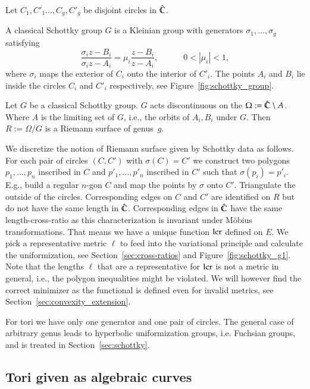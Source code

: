 \documentclass[Thesis]{subfiles}
\begin{document}
Let $C_1,C'_1\ldots,C_g,C'_g$ be disjoint circles in $\hat{\mathbb C}$.
\begin{definition} A classical Schottky group $G$ is a Kleinian group with generators $\sigma_1,\ldots,\sigma_g$ satisfying
\begin{equation}
\frac{\sigma_i z - B_i}{\sigma_i z - A_i} = \mu_i \frac{z - B_i}{z - A_i},
\quad\quad\quad 0 < \left|\mu_i\right|<1,
\end{equation}
where $\sigma_i$ maps the exterior of $C_i$ onto the interior of $C'_i$. The points $A_i$ and $B_i$ lie inside the circles $C_i$ and $C'_i$ respectively, see Figure~\ref{fig:schottky_group}.
\end{definition}
Let $G$ be a classical Schottky group. $G$ acts discontinuous on the $\Omega:=\hat{\mathbb C}\setminus A$. 
Where $A$ is the limiting set of $G$, i.e., the orbits of $A_i, B_i$ under $G$.
Then $R:=\Omega/G$ is a Riemann surface of genus~$g$.

We discretize the notion of Riemann surface given by Schottky data as follows.
For each pair of circles $(C, C')$ with $\sigma(C) =C'$ we construct two polygons $p_1,\ldots,p_n$ inscribed in $C$ and $p'_1,\ldots,p'_n$ inscribed in $C'$ such that $\sigma(p_i)=p'_i$. E.g., build a regular $n$-gon $C$ and map the points by $\sigma$ onto $C'$.
Triangulate the outside of the circles.
Corresponding edges on $C$ and $C'$ are identified on $R$ but do not have the same length in $\hat{\mathbb C}$.
Corresponding edges in $\hat{\mathbb C}$ have the same length-cross-ratio as this characterization is invariant under M\"{o}bius transformations.
That means we have a unique function $\operatorname{lcr}$ defined on $E$.
We pick a representative metric $\ell$ to feed into the variational principle and calculate the uniformization, see Section~\ref{sec:cross-ratios} and Figure~\ref{fig:schottky_g1}.
Note that the lengths $\ell$ that are a representative for $\operatorname{lcr}$ is not a metric in general, i.e., the polygon inequalities might be violated. 
We will however find the correct minimizer as the functional is defined even for invalid metrics, see Section~\ref{sec:convexity_extension}.

For tori we have only one generator and one pair of circles. 
The general case of arbitrary genus leads to hyperbolic uniformization groups, i.e. Fuchsian groups, and is treated in Section~\ref{sec:schottky}.

\subsection{Tori given as algebraic curves}
\label{sec:discrete_algebraic_curves}
\end{document}
